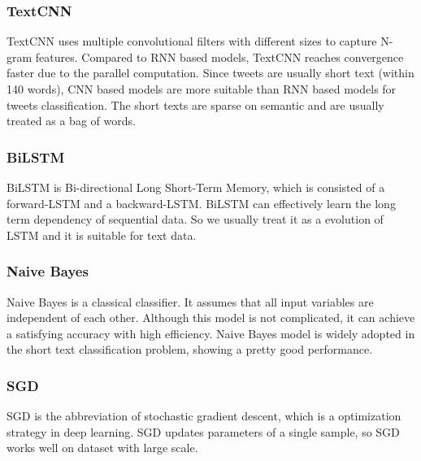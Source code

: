 \subsubsection{TextCNN}
TextCNN uses multiple convolutional filters with different sizes to capture N-gram features. Compared to RNN based models, TextCNN reaches convergence faster due to the parallel computation. Since tweets are usually short text (within 140 words), CNN based models are more suitable than RNN based models for tweets classification. The short texts are sparse on semantic and are usually treated as a bag of words.

\subsubsection{BiLSTM}
BiLSTM is Bi-directional Long Short-Term Memory, which is consisted of a forward-LSTM and a backward-LSTM. BiLSTM can effectively learn the long term dependency of sequential data. So we usually treat it as a evolution of LSTM and it is suitable for text data.

\subsubsection{Naive Bayes}
Naive Bayes is a classical classifier. It assumes that all input variables are independent of each other. Although this model is not complicated, it can achieve a satisfying accuracy with high efficiency. Naive Bayes model is widely adopted in the short text classification problem, showing a pretty good performance. 

\subsubsection{SGD}
SGD is the abbreviation of stochastic gradient descent, which is a optimization strategy in deep learning. SGD updates parameters of a single sample, so SGD works well on dataset with large scale. 

